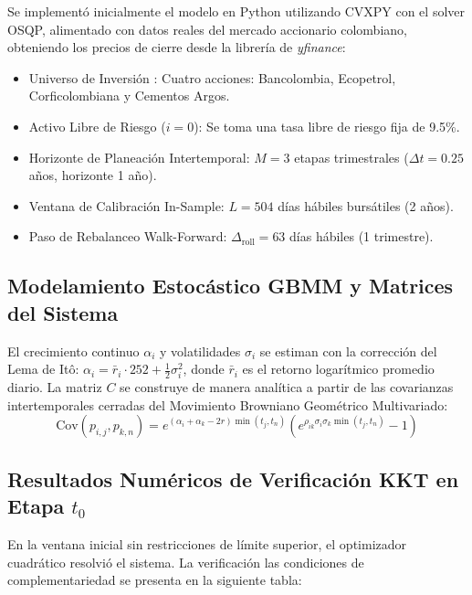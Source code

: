 \documentclass[11pt,a4paper]{article}
\begin{document}
Se implementó inicialmente el modelo en Python utilizando CVXPY con el solver OSQP, alimentado con datos reales del mercado accionario colombiano, obteniendo los precios de cierre desde la librería de \textit{yfinance}:
\begin{itemize}
    \item Universo de Inversión : Cuatro acciones: Bancolombia, Ecopetrol, Corficolombiana y Cementos Argos.
    \item Activo Libre de Riesgo ($i=0$): Se toma una tasa libre de riesgo fija de 9.5\%.
    \item Horizonte de Planeación Intertemporal: $M = 3$ etapas trimestrales ($\Delta t = 0.25$ años, horizonte 1 año).
    \item Ventana de Calibración In-Sample: $L = 504$ días hábiles bursátiles (2 años).
    \item Paso de Rebalanceo Walk-Forward: $\Delta_{\mathrm{roll}} = 63$ días hábiles (1 trimestre).
\end{itemize}

\subsection{Modelamiento Estocástico GBMM y Matrices del Sistema}
El crecimiento continuo $\alpha_i$ y volatilidades $\sigma_i$ se estiman con la corrección del Lema de Itô: $\alpha_i = \bar{r}_i \cdot 252 + \frac{1}{2}\sigma_i^2$, donde $\bar{r}_i$ es el retorno logarítmico promedio diario. La matriz $C$ se construye de manera analítica a partir de las covarianzas intertemporales cerradas del Movimiento Browniano Geométrico Multivariado:
\begin{equation}
    \mathrm{Cov}(p_{i,j}, p_{k,n}) = e^{(\alpha_i + \alpha_k - 2r)\min(t_j, t_n)} \left( e^{\rho_{ik} \sigma_i \sigma_k \min(t_j, t_n)} - 1 \right)
\end{equation}

\subsection{Resultados Numéricos de Verificación KKT en Etapa \texorpdfstring{$t_0$}{t0}}
En la ventana inicial sin restricciones de límite superior, el optimizador cuadrático resolvió el sistema. La verificación las condiciones de complementariedad se presenta en la siguiente tabla:
\end{document}
